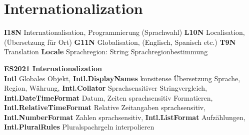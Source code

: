 \section{Internationalization}
\textbf{\color{blue}I18N} Internationalisation, Programmierung (Sprachwahl)
\textbf{\color{blue}L10N} Localisation, (Übersetzung für Ort)
\textbf{\color{blue}G11N} Globalisation, (Englisch, Spanisch etc.)
\textbf{\color{blue}T9N} Translation
\textbf{\color{blue}Locale} Sprachregion: String Sprachregionbestimmung

\textbf{\color{blue}ES2021 Internationalization} \\
\textbf{Intl} Globales Objekt, \textbf{Intl.DisplayNames}  konsitense Übersetzung Sprache, Region, Währung, \textbf{Intl.Collator}  Sprachsensitiver Stringvergleich, \textbf{Intl.DateTimeFormat} Datum, Zeiten sprachsensitiv Formatieren, \textbf{Intl.RelativeTimeFormat} Relative Zeitangaben sprachsensitiv,  \textbf{Intl.NumberFormat} Zahlen sprachsensitiv, \textbf{Intl.ListFormat} Aufzählungen, \textbf{Intl.PluralRules} Pluralspachrgeln interpolieren
